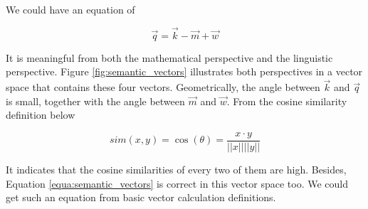 \documentclass[thesis,fonts=libertine]{cluu}
\begin{document}
We could have an equation of 

\begin{equation}
  \label{equa:semantic_vectors}
  \vec{q}=\vec{k}-\vec{m}+\vec{w}
\end{equation}

It is meaningful from both the mathematical perspective and the linguistic perspective. Figure \ref{fig:semantic_vectors} illustrates both perspectives in a vector space that contains these four vectors. Geometrically, the angle between $\vec{k}$ and $\vec{q}$ is small, together with the angle between $\vec{m}$ and $\vec{w}$. From the cosine similarity definition below

\begin{equation*}
  sim(x, y) = \cos(\theta) = \frac{x \cdot y}{||x||||y||}
\end{equation*}

It indicates that the cosine similarities of every two of them are high. Besides, Equation \ref{equa:semantic_vectors} is correct in this vector space too. We could get such an equation from basic vector calculation definitions.
\end{document}
